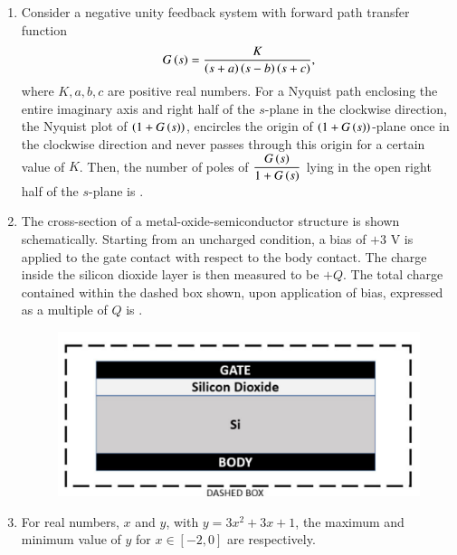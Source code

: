 \documentclass[journal,12pt,onecolumn]{IEEEtran}
\theoremstyle{remark}
\begin{document}
\begin{enumerate}[start=1, label=Q.\arabic*]
\hfill{}

\item Consider a negative unity feedback system with forward path transfer function 
\[
G\left(s\right) = \frac{K}{\left(s+a\right)\left(s-b\right)\left(s+c\right)},
\] 
where $K, a, b, c$ are positive real numbers. For a Nyquist path enclosing the entire imaginary axis and right half of the $s$-plane in the clockwise direction, the Nyquist plot of $\left(1+G\left(s\right)\right)$, encircles the origin of $\left(1+G\left(s\right)\right)$-plane once in the clockwise direction and never passes through this origin for a certain value of $K$. Then, the number of poles of $\dfrac{G\left(s\right)}{1+G\left(s\right)}$ lying in the open right half of the $s$-plane is \underline{\hspace{2cm}}.
\hfill {}

\item The cross-section of a metal-oxide-semiconductor structure is shown schematically. Starting from an uncharged condition, a bias of $+3$ V is applied to the gate contact with respect to the body contact. The charge inside the silicon dioxide layer is then measured to be $+Q$. The total charge contained within the dashed box shown, upon application of bias, expressed as a multiple of $Q$  is \underline{\hspace{2cm}}.
\begin{figure}[H]
    \centering
    \includegraphics[width=0.6\columnwidth]{Figures/35.png}
    \caption{}
\end{figure}

\hfill{}

\item For real numbers, $x$ and $y$, with $y=3x^{2}+3x+1$, the maximum and minimum value of $y$ for $x \in [-2,0]$ are respectively.
    \begin{enumerate}
    \end{enumerate}


\end{enumerate}
\end{document}
